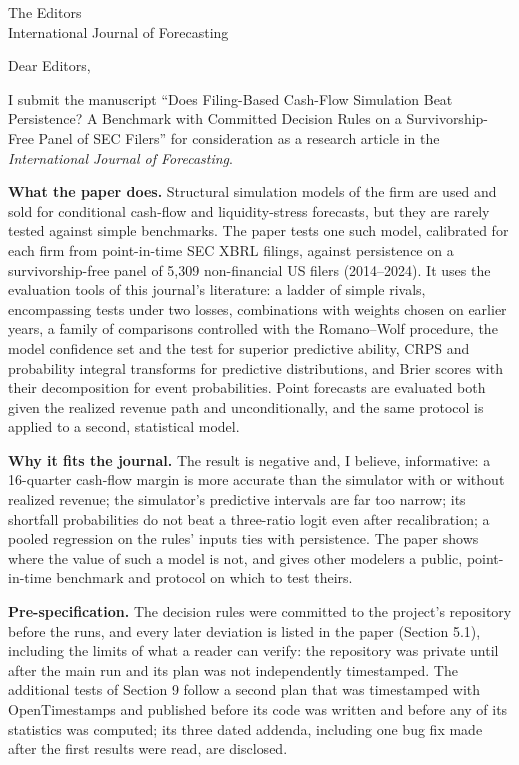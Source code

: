 \documentclass[11pt]{letter}
\begin{document}
\begin{letter}{The Editors\\International Journal of Forecasting}
\opening{Dear Editors,}

I submit the manuscript ``Does Filing-Based Cash-Flow Simulation Beat Persistence? A Benchmark with Committed Decision Rules on a Survivorship-Free Panel of SEC Filers'' for consideration as a research article in the \emph{International Journal of Forecasting}.

\textbf{What the paper does.} Structural simulation models of the firm are used and sold for conditional cash-flow and liquidity-stress forecasts, but they are rarely tested against simple benchmarks. The paper tests one such model, calibrated for each firm from point-in-time SEC XBRL filings, against persistence on a survivorship-free panel of 5,309 non-financial US filers (2014--2024). It uses the evaluation tools of this journal's literature: a ladder of simple rivals, encompassing tests under two losses, combinations with weights chosen on earlier years, a family of comparisons controlled with the Romano--Wolf procedure, the model confidence set and the test for superior predictive ability, CRPS and probability integral transforms for predictive distributions, and Brier scores with their decomposition for event probabilities. Point forecasts are evaluated both given the realized revenue path and unconditionally, and the same protocol is applied to a second, statistical model.

\textbf{Why it fits the journal.} The result is negative and, I believe, informative: a 16-quarter cash-flow margin is more accurate than the simulator with or without realized revenue; the simulator's predictive intervals are far too narrow; its shortfall probabilities do not beat a three-ratio logit even after recalibration; a pooled regression on the rules' inputs ties with persistence. The paper shows where the value of such a model is not, and gives other modelers a public, point-in-time benchmark and protocol on which to test theirs.

\textbf{Pre-specification.} The decision rules were committed to the project's repository before the runs, and every later deviation is listed in the paper (Section 5.1), including the limits of what a reader can verify: the repository was private until after the main run and its plan was not independently timestamped. The additional tests of Section 9 follow a second plan that was timestamped with OpenTimestamps and published before its code was written and before any of its statistics was computed; its three dated addenda, including one bug fix made after the first results were read, are disclosed.


\end{letter}
\end{document}
